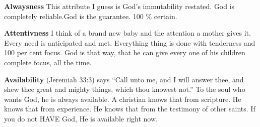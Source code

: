 \begin{compactenum}[I.][19]
    \item \textbf{Alwaysness} This attribute I guess is God's immutability restated. God is completely reliable.God is the guarantee. 100 \% certain. %
    \item \textbf{Attentivness} I think of a brand new baby and the attention a mother gives it. Every need is anticipated and met. Everything thing is done with tenderness and 100 per cent focus. God is that way, that he can give every one of his children complete focus, all the time.
    \item \textbf{Availability}  (Jeremiah 33:3) says ``Call unto me, and I will answer thee, and shew thee great and mighty things, which thou knowest not.''  To the soul who wants God, he is always available. A christian knows that  from scripture. He knows that from experience. He knows that from the testimony of other saints. If you do not HAVE God, He is available right now. 
\end{compactenum}

